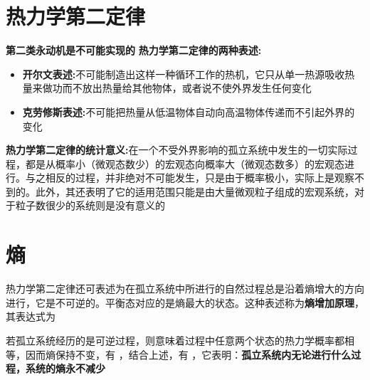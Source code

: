 \documentclass[12pt, a4paper, twoside]{ctexbook}
\begin{document}
\section{热力学第二定律}

\textbf{第二类永动机是不可能实现的}
\textbf{热力学第二定律的两种表述:}

\begin{itemize}
    \item \textbf{开尔文表述:}不可能制造出这样一种循环工作的热机，它只从单一热源吸收热量来做功而不放出热量给其他物体，或者说不使外界发生任何变化
    \item \textbf{克劳修斯表述:}不可能把热量从低温物体自动向高温物体传递而不引起外界的变化
\end{itemize}

\textbf{热力学第二定律的统计意义:}在一个不受外界影响的孤立系统中发生的一切实际过程，都是从概率小（微观态数少）的宏观态向概率大（微观态数多）的宏观态进行。与之相反的过程，并非绝对不可能发生，只是由于概率极小，实际上是观察不到的。此外，其还表明了它的适用范围只能是由大量微观粒子组成的宏观系统，对于粒子数很少的系统则是没有意义的


\section{熵}
热力学第二定律还可表述为在孤立系统中所进行的自然过程总是沿着熵增大的方向进行，它是不可逆的。平衡态对应的是熵最大的状态。这种表述称为\textbf{熵增加原理}，其表达式为

若孤立系统经历的是可逆过程，则意味着过程中任意两个状态的热力学概率都相等，因而熵保持不变，有          ，结合上述，有      ，它表明：\textbf{孤立系统内无论进行什么过程，系统的熵永不减少}
\end{document}
